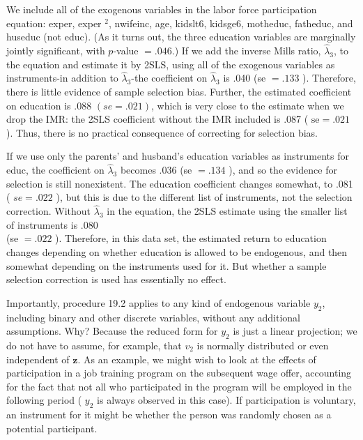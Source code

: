 \documentclass[10pt]{article}
\begin{document}
We include all of the exogenous variables in the labor force participation equation: exper, exper ${ }^{2}$, nwifeinc, age, kidslt6, kidsge6, motheduc, fatheduc, and huseduc (not educ). (As it turns out, the three education variables are marginally jointly significant, with $p$-value $=.046$.) If we add the inverse Mills ratio, $\hat{\lambda}_{3}$, to the equation and estimate it by 2SLS, using all of the exogenous variables as instruments-in addition to $\hat{\lambda}_{3}$-the coefficient on $\hat{\lambda}_{3}$ is .040 (se $=.133$ ). Therefore, there is little evidence of sample selection bias. Further, the estimated coefficient on education is .088 $(s e=.021)$, which is very close to the estimate when we drop the IMR: the 2SLS coefficient without the IMR included is .087 ( $\mathrm{se}=.021$ ). Thus, there is no practical consequence of correcting for selection bias.

If we use only the parents' and husband's education variables as instruments for educ, the coefficient on $\hat{\lambda}_{3}$ becomes .036 (se $=.134$ ), and so the evidence for selection is still nonexistent. The education coefficient changes somewhat, to .081 ( $s e=.022$ ), but this is due to the different list of instruments, not the selection correction. Without $\hat{\lambda}_{3}$ in the equation, the 2SLS estimate using the smaller list of instruments is .080\\
(se $=.022$ ). Therefore, in this data set, the estimated return to education changes depending on whether education is allowed to be endogenous, and then somewhat depending on the instruments used for it. But whether a sample selection correction is used has essentially no effect.

Importantly, procedure 19.2 applies to any kind of endogenous variable $y_{2}$, including binary and other discrete variables, without any additional assumptions. Why? Because the reduced form for $y_{2}$ is just a linear projection; we do not have to assume, for example, that $v_{2}$ is normally distributed or even independent of $\mathbf{z}$. As an example, we might wish to look at the effects of participation in a job training program on the subsequent wage offer, accounting for the fact that not all who participated in the program will be employed in the following period ( $y_{2}$ is always observed in this case). If participation is voluntary, an instrument for it might be whether the person was randomly chosen as a potential participant.
\end{document}
